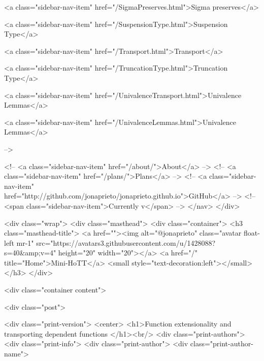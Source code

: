      
        
          <a class="sidebar-nav-item" href="/SigmaPreserves.html">Sigma preserves</a>
        
      
    
      
        
          <a class="sidebar-nav-item" href="/SuspensionType.html">Suspension Type</a>
        
      
    
      
        
          <a class="sidebar-nav-item" href="/Transport.html">Transport</a>
        
      
    
      
        
          <a class="sidebar-nav-item" href="/TruncationType.html">Truncation Type</a>
        
      
    
      
        
          <a class="sidebar-nav-item" href="/UnivalenceTransport.html">Univalence Lemmas</a>
        
      
    
      
        
          <a class="sidebar-nav-item" href="/UnivalenceLemmas.html">Univalence Lemmas</a>
        
      
     -->

    <!-- <a class="sidebar-nav-item" href="/about/">About</a> -->
    <!-- <a class="sidebar-nav-item" href="/plans/">Plans</a> -->
    <!-- <a class="sidebar-nav-item" href="http://github.com/jonaprieto/jonaprieto.github.io">GitHub</a> -->
    <!-- <span class="sidebar-nav-item">Currently v</span> -->
  </nav>
</div>

    <div class="wrap">
      <div class="masthead">
        <div class="container">
          <h3 class="masthead-title">
            <a href=""><img alt="@jonaprieto" class="avatar float-left mr-1" src="https://avatars3.githubusercontent.com/u/1428088?s=40&amp;v=4" height="20" width="20"></a>
            <a href="/" title="Home">Mini-HoTT</a>
            <small style="text-decoration:left"></small>
          </h3>
        </div>
      
      <div class="container content">
        







<div class="post">

  <div class="print-version">
    <center>
      <h1>Function extensionality and transporting dependent functions </h1><br/>
        <div class="print-authors">
          <div class="print-info">
            <div class="print-author">
              <div class="print-author-name">
                

